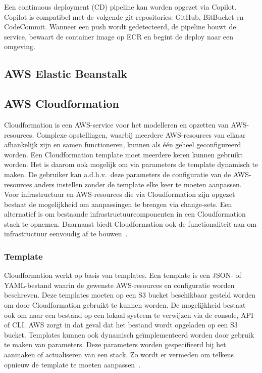 Een continuous deployment (CD) pipeline kan worden opgezet via Copilot.
Copilot is compatibel met de volgende git repositories: GitHub, BitBucket en CodeCommit.
Wanneer een push wordt gedetecteerd, de pipeline bouwt de service, bewaart de container image op ECR en begint de deploy naar een omgeving.

\subsection{AWS Elastic Beanstalk}
\label{subsec:service-elastic-beanstalk}

\subsection{AWS Cloudformation}
\label{subsec:service-cloudformation}

Cloudformation is een AWS-service voor het modelleren en opzetten van AWS-resources.
Complexe opstellingen, waarbij meerdere AWS-resources van elkaar afhankelijk zijn en samen functioneren, kunnen als één geheel geconfigureerd worden.
Een Cloudformation template moet meerdere keren kunnen gebruikt worden.
Het is daarom ook mogelijk om via parameters de template dynamisch te maken.
De gebruiker kan a.d.h.v.\ deze parameters de configuratie van de AWS-resources anders instellen zonder de template elke keer te moeten aanpassen.
Voor infrastructuur en AWS-resources die via Cloudformation zijn opgezet bestaat de mogelijkheid om aanpassingen te brengen via change-sets.
Een alternatief is om bestaande infrastructuurcomponenten in een Cloudformation stack te opnemen.
Daarnaast biedt Cloudformation ook de functionaliteit aan om infrastructuur eenvoudig af te bouwen~\autocite{Mansoor2014}.

\subsubsection{Template}

Cloudformation werkt op basis van templates.
Een template is een JSON- of YAML-bestand waarin de gewenste AWS-resources en configuratie worden beschreven.
Deze templates moeten op een S3 bucket beschikbaar gesteld worden om door Cloudformation gebruikt te kunnen worden.
De mogelijkheid bestaat ook om naar een bestand op een lokaal systeem te verwijzen via de console, API of CLI.
AWS zorgt in dat geval dat het bestand wordt opgeladen op een S3 bucket.
Templates kunnen ook dynamisch geïmplementeerd worden door gebruik te maken van parameters.
Deze parameters worden gespecifieerd bij het aanmaken of actualiseren van een stack.
Zo wordt er vermeden om telkens opnieuw de template te moeten aanpassen~\autocite{AWSCLoudformationUser}.


